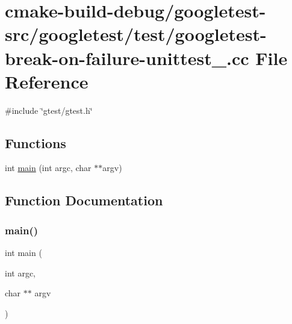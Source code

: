 \hypertarget{googletest-break-on-failure-unittest___8cc}{}\section{cmake-\/build-\/debug/googletest-\/src/googletest/test/googletest-\/break-\/on-\/failure-\/unittest\+\_\+.cc File Reference}
\label{googletest-break-on-failure-unittest___8cc}
{\ttfamily \#include \char`\"{}gtest/gtest.\+h\char`\"{}}\newline
\subsection*{Functions}
\begin{DoxyCompactItemize}
\item 
int \mbox{\hyperlink{googletest-break-on-failure-unittest___8cc_a3c04138a5bfe5d72780bb7e82a18e627}{main}} (int argc, char $\ast$$\ast$argv)
\end{DoxyCompactItemize}


\subsection{Function Documentation}
\mbox{\label{googletest-break-on-failure-unittest___8cc_a3c04138a5bfe5d72780bb7e82a18e627}} 
\subsubsection{\texorpdfstring{main()}{main()}}
{\footnotesize\ttfamily int main (\begin{DoxyParamCaption}\item[{int}]{argc,  }\item[{char $\ast$$\ast$}]{argv }\end{DoxyParamCaption})}

